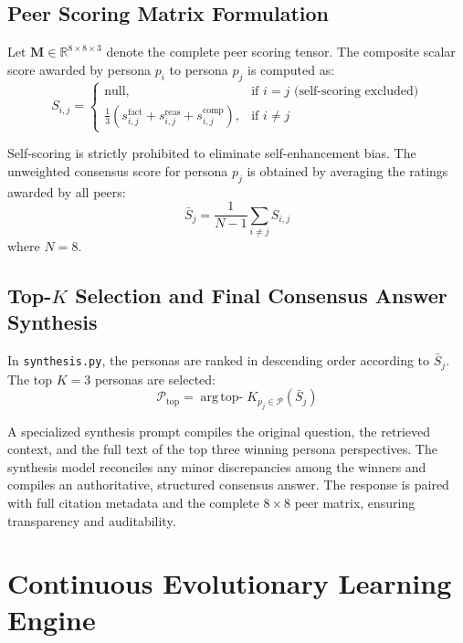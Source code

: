 \subsection{Peer Scoring Matrix Formulation}
Let $\mathbf{M} \in \mathbb{R}^{8 \times 8 \times 3}$ denote the complete peer scoring tensor. The composite scalar score awarded by persona $p_i$ to persona $p_j$ is computed as:
\begin{equation}
\label{eq:peer_score}
S_{i,j} = 
\begin{cases} 
\text{null}, & \text{if } i = j \text{ (self-scoring excluded)} \\
\frac{1}{3} \left( s_{i,j}^{\text{fact}} + s_{i,j}^{\text{reas}} + s_{i,j}^{\text{comp}} \right), & \text{if } i \neq j 
\end{cases}
\end{equation}

Self-scoring is strictly prohibited to eliminate self-enhancement bias. The unweighted consensus score for persona $p_j$ is obtained by averaging the ratings awarded by all peers:
\begin{equation}
\label{eq:avg_score}
\bar{S}_j = \frac{1}{N-1} \sum_{i \neq j} S_{i,j}
\end{equation}
where $N = 8$.

\subsection{Top-$K$ Selection and Final Consensus Answer Synthesis}
In \texttt{synthesis.py}, the personas are ranked in descending order according to $\bar{S}_j$. The top $K = 3$ personas are selected:
\begin{equation}
\mathcal{P}_{\text{top}} = \operatorname{arg\,top-}K_{p_j \in \mathcal{P}} (\bar{S}_j)
\end{equation}

A specialized synthesis prompt compiles the original question, the retrieved context, and the full text of the top three winning persona perspectives. The synthesis model reconciles any minor discrepancies among the winners and compiles an authoritative, structured consensus answer. The response is paired with full citation metadata and the complete $8 \times 8$ peer matrix, ensuring transparency and auditability.

\section{Continuous Evolutionary Learning Engine}
\label{sec:evolution_engine}

